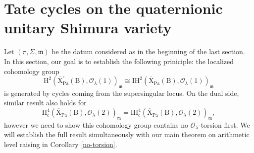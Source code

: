 \documentclass[10pt]{amsart}
\numberwithin{equation}{section}
\theoremstyle{definition}
\def\Pa{\mathrm{Pa}}
\def\calO{\mathcal{O}}
\def\fracm{\mathfrak{m}}
\def\rmc{\mathrm{c}}
\def\rmB{\mathrm{B}}
\def\rmH{\mathrm{H}}
\def\rmX{\mathrm{X}}
\begin{document}
\section{Tate cycles on the quaternionic unitary Shimura variety}
Let $(\pi, \Sigma, \fracm)$ be the datum considered as in the beginning of the last section. In this section, our goal is to establish the following priniciple: the localized cohomology group 
\begin{equation*}
\rmH^{2}(\overline{\rmX}^{\square}_{\Pa}(\rmB), \calO_{\lambda}(1))_{\fracm}\cong \mathrm{IH}^{2}(\overline{\rmX}_{\Pa}(\rmB), \calO_{\lambda}(1))_{\fracm} 
\end{equation*}
is generated by cycles coming from the supersingular locus. On the dual side, similar result also holds for 
\begin{equation*}
\rmH^{4}_{\rmc}(\overline{\rmX}_{\Pa}(\rmB), \calO_{\lambda}(2))_{\fracm}= \mathrm{IH}^{4}_{\rmc}(\overline{\rmX}_{\Pa}(\rmB), \calO_{\lambda}(2))_{\fracm},
\end{equation*}
however we need to show this cohomology group contains no $\calO_{\lambda}$-torsion first. We will establish the full result simultaneously with our main theorem on arithmetic level raising in {Corollary} \ref{no-torsion}. 
\end{document}
